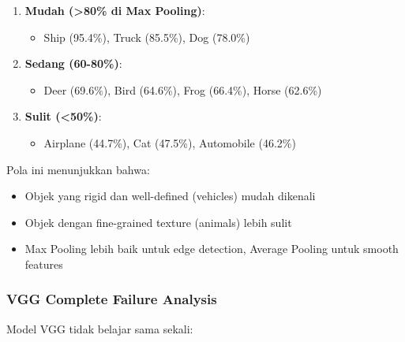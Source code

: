 \documentclass[12pt,a4paper]{report}
\begin{document}
\begin{enumerate}
    \item \textbf{Mudah (>80\% di Max Pooling)}: 
    \begin{itemize}
        \item Ship (95.4\%), Truck (85.5\%), Dog (78.0\%)
    \end{itemize}
    
    \item \textbf{Sedang (60-80\%)}: 
    \begin{itemize}
        \item Deer (69.6\%), Bird (64.6\%), Frog (66.4\%), Horse (62.6\%)
    \end{itemize}
    
    \item \textbf{Sulit (<50\%)}: 
    \begin{itemize}
        \item Airplane (44.7\%), Cat (47.5\%), Automobile (46.2\%)
    \end{itemize}
\end{enumerate}

Pola ini menunjukkan bahwa:\vspace{0.3cm}
\begin{itemize}
    \item Objek yang rigid dan well-defined (vehicles) mudah dikenali
    \item Objek dengan fine-grained texture (animals) lebih sulit
    \item Max Pooling lebih baik untuk edge detection, Average Pooling untuk smooth features
\end{itemize}

\subsubsection{VGG Complete Failure Analysis}

Model VGG tidak belajar sama sekali:
\end{document}
